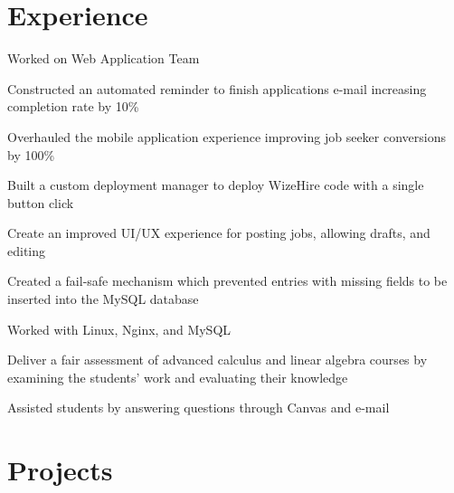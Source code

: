 \documentclass[]{deedy-resume-openfont}
\begin{document}
\begin{minipage}[t]{0.66\textwidth} 


\section{Experience}

\vspace{\topsep} %
\begin{tightemize}
\item Worked on Web Application Team
\item Constructed an automated reminder to finish applications e-mail increasing completion rate by 10\%
\item Overhauled the mobile application experience improving job seeker conversions by 100\%
\item Built a custom deployment manager to deploy WizeHire code with a single button click
\item Create an improved UI/UX experience for posting jobs, allowing drafts, and editing
\item Created a fail-safe mechanism which prevented entries with missing fields to be inserted into the MySQL database
\item Worked with Linux, Nginx, and MySQL
\end{tightemize}
\sectionsep

\begin{tightemize}
\item Deliver a fair assessment of advanced calculus and linear algebra courses by examining the students’ work and evaluating their knowledge 
\item Assisted students by answering questions through Canvas and e-mail
\end{tightemize}
\sectionsep

\section{Projects}


\end{minipage}
\end{document}
